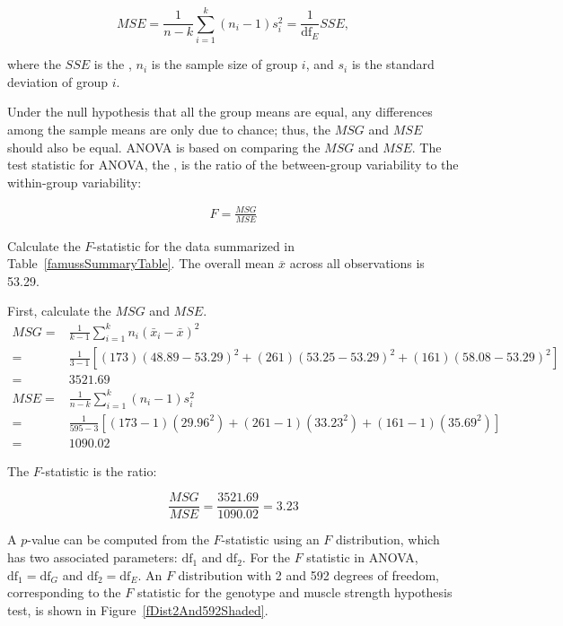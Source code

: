 \[MSE = \frac{1}{n-k}\sum_{i=1}^{k} (n_i-1)s_i^{2} = \frac{1}{\textrm{df}_{E}}SSE, \]

where the $SSE$ is the , $n_i$ is the sample size of group $i$, and $s_i$ is the standard deviation of group $i$.

Under the null hypothesis that all the group means are equal, any differences among the sample means are only due to chance; thus, the $MSG$ and $MSE$ should also be equal. ANOVA is based on comparing the $MSG$ and $MSE$. The test statistic for ANOVA, the , is the ratio of the between-group variability to the within-group variability:

\begin{align} \label{formulaForTheFStatistic}
F = \frac{MSG}{MSE}
\end{align}

\begin{example}{Calculate the $F$-statistic for the  data summarized in Table~\ref{famussSummaryTable}. The overall mean $\overline{x}$ across all observations is 53.29.}
 
First, calculate the $MSG$ and $MSE$. 
\vspace{0mm}
\begin{align*}
MSG =& \frac{1}{k-1}\sum_{i=1}^{k} n_{i}\left(\bar{x}_{i} - \bar{x}\right)^{2} \\
=& \frac{1}{3-1} [(173)(48.89 - 53.29)^{2} + (261)(53.25 - 53.29)^{2} + (161)(58.08 - 53.29)^{2} ]\\
=& 3521.69 \\
MSE =& \frac{1}{n-k}\sum_{i=1}^{k} (n_i-1)s_i^{2} \\
=& \frac{1}{595-3}[(173-1)(29.96^2) + (261-1)(33.23^2) + (161-1)(35.69^2)] \\
=& 1090.02
\end{align*}

The $F$-statistic is the ratio:

\[\dfrac{MSG}{MSE} = \dfrac{3521.69}{1090.02} = 3.23 \]

\end{example} 

A $p$-value can be computed from the $F$-statistic using an $F$ distribution, which has two associated parameters: $\textrm{df}_{1}$ and $\textrm{df}_{2}$. For the $F$ statistic in ANOVA, $\textrm{df}_{1} = \textrm{df}_{G}$ and $\textrm{df}_{2}= \textrm{df}_{E}$. An $F$ distribution with 2 and 592 degrees of freedom, corresponding to the $F$ statistic for the genotype and muscle strength hypothesis test, is shown in Figure~\ref{fDist2And592Shaded}.

